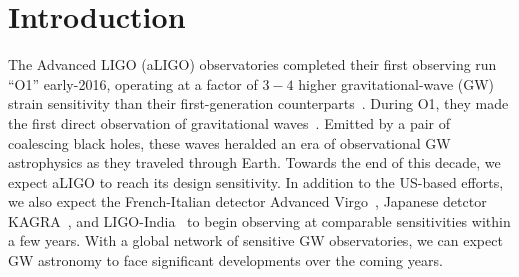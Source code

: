 \documentclass[aps,prd,amsmath,floats,floatfix, twocolumn,
superscriptaddress,nofootinbib,showpacs]{revtex4-1}
\begin{document}
\pacs{}

\maketitle

\section{Introduction}\label{s1:introduction}

The Advanced LIGO (aLIGO) observatories completed their first observing run ``O1''
early-2016, operating at a factor of $3-4$ higher gravitational-wave
(GW) strain sensitivity than their first-generation 
counterparts~\cite{Shoemaker2009}.
% 
During O1, they made the first direct observation of gravitational 
waves~\cite{LIGOVirgo2016a}. Emitted by a pair of coalescing black holes, these
waves heralded an era of observational GW astrophysics as they traveled 
through Earth.
% 
Towards the end of this decade, we expect aLIGO to reach its design sensitivity.
In addition to the US-based efforts, we also expect the French-Italian detector Advanced
Virgo~\cite{aVIRGO,aVirgo2}, Japanese detctor KAGRA~\cite{kagra,Somiya:2011np},
and LIGO-India~\cite{2013IJMPD..2241010U} to begin observing at comparable
sensitivities within a few years. With a global network of sensitive GW
 observatories, we can expect GW astronomy to face significant developments over the
coming years.
\end{document}

